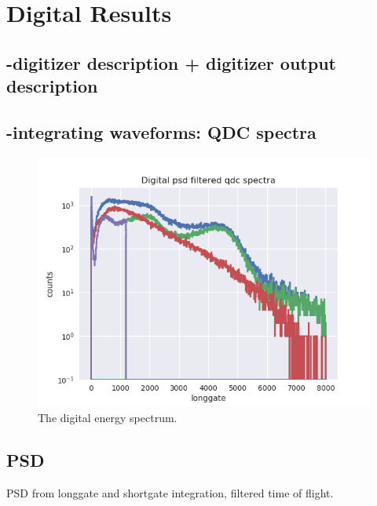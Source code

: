 \documentclass[main.tex]{subfiles}
\begin{document}
\section{Digital Results}
\subsection{-digitizer description + digitizer output description}

\subsection{-integrating waveforms: QDC spectra}
\begin{figure}[ht]
    \centering
        \includegraphics[scale=.75]{DigitalResults/qdc_psd.png}
        \caption{The digital energy spectrum.}
    \label{fig:D_QDC}
\end{figure}

\subsection{PSD}
PSD from longgate and shortgate integration, filtered time of flight.
\end{document}
